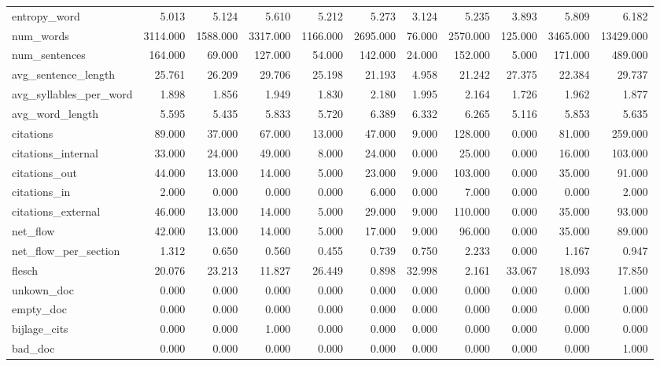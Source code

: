 \begin{tabular}{lrrrrrrrrrr}
\cline{1-11}
entropy\_word & 5.013 & 5.124 & 5.610 & 5.212 & 5.273 & 3.124 & 5.235 & 3.893 & 5.809 & 6.182 \\
\cline{1-11}
num\_words & 3114.000 & 1588.000 & 3317.000 & 1166.000 & 2695.000 & 76.000 & 2570.000 & 125.000 & 3465.000 & 13429.000 \\
\cline{1-11}
num\_sentences & 164.000 & 69.000 & 127.000 & 54.000 & 142.000 & 24.000 & 152.000 & 5.000 & 171.000 & 489.000 \\
\cline{1-11}
avg\_sentence\_length & 25.761 & 26.209 & 29.706 & 25.198 & 21.193 & 4.958 & 21.242 & 27.375 & 22.384 & 29.737 \\
\cline{1-11}
avg\_syllables\_per\_word & 1.898 & 1.856 & 1.949 & 1.830 & 2.180 & 1.995 & 2.164 & 1.726 & 1.962 & 1.877 \\
\cline{1-11}
avg\_word\_length & 5.595 & 5.435 & 5.833 & 5.720 & 6.389 & 6.332 & 6.265 & 5.116 & 5.853 & 5.635 \\
\cline{1-11}
citations & 89.000 & 37.000 & 67.000 & 13.000 & 47.000 & 9.000 & 128.000 & 0.000 & 81.000 & 259.000 \\
\cline{1-11}
citations\_internal & 33.000 & 24.000 & 49.000 & 8.000 & 24.000 & 0.000 & 25.000 & 0.000 & 16.000 & 103.000 \\
\cline{1-11}
citations\_out & 44.000 & 13.000 & 14.000 & 5.000 & 23.000 & 9.000 & 103.000 & 0.000 & 35.000 & 91.000 \\
\cline{1-11}
citations\_in & 2.000 & 0.000 & 0.000 & 0.000 & 6.000 & 0.000 & 7.000 & 0.000 & 0.000 & 2.000 \\
\cline{1-11}
citations\_external & 46.000 & 13.000 & 14.000 & 5.000 & 29.000 & 9.000 & 110.000 & 0.000 & 35.000 & 93.000 \\
\cline{1-11}
net\_flow & 42.000 & 13.000 & 14.000 & 5.000 & 17.000 & 9.000 & 96.000 & 0.000 & 35.000 & 89.000 \\
\cline{1-11}
net\_flow\_per\_section & 1.312 & 0.650 & 0.560 & 0.455 & 0.739 & 0.750 & 2.233 & 0.000 & 1.167 & 0.947 \\
\cline{1-11}
flesch & 20.076 & 23.213 & 11.827 & 26.449 & 0.898 & 32.998 & 2.161 & 33.067 & 18.093 & 17.850 \\
\cline{1-11}
unkown\_doc & 0.000 & 0.000 & 0.000 & 0.000 & 0.000 & 0.000 & 0.000 & 0.000 & 0.000 & 1.000 \\
\cline{1-11}
empty\_doc & 0.000 & 0.000 & 0.000 & 0.000 & 0.000 & 0.000 & 0.000 & 0.000 & 0.000 & 0.000 \\
\cline{1-11}
bijlage\_cits & 0.000 & 0.000 & 1.000 & 0.000 & 0.000 & 0.000 & 0.000 & 0.000 & 0.000 & 0.000 \\
\cline{1-11}
bad\_doc & 0.000 & 0.000 & 0.000 & 0.000 & 0.000 & 0.000 & 0.000 & 0.000 & 0.000 & 1.000 \\
\cline{1-11}
\bottomrule
\end{tabular}
